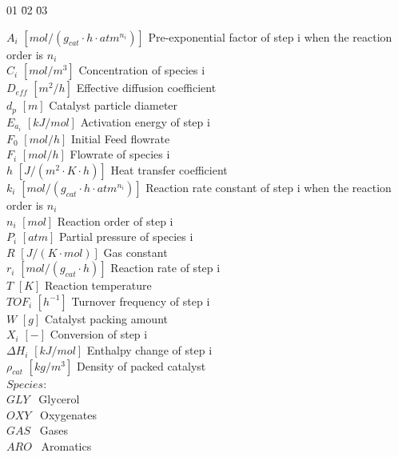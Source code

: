 \documentclass[journal=iecred,manuscript=article]{achemso}
\begin{document}
\begin{tabbing}

01\hspace*{50bp} \=02\hspace*{100bp} \=03\hspace*{50bp}\kill

$A_i$  \> $[mol/(g_{cat} \cdot h \cdot atm^{n_i})]$   \> Pre-exponential factor of step i when the reaction order is $n_i$ \\
$C_i$  \> $[mol/m^3]$   \> Concentration of species i \\
$D_{eff}$  \> $[m^2/h]$   \> Effective diffusion coefficient \\
$d_p$  \> $[m]$   \> Catalyst particle diameter \\
$E_{a_i}$  \> $[kJ/mol]$   \> Activation energy of step i \\
$F_0$  \> $[mol/h]$   \> Initial Feed flowrate \\
$F_i$  \> $[mol/h]$   \> Flowrate of species i \\
$h$  \> $[J/\left( m^2 \cdot K \cdot h\right)]$   \> Heat transfer coefficient \\
$k_i$  \> $[mol/(g_{cat} \cdot h \cdot atm^{n_i}) ]$   \> Reaction rate constant of step i when the reaction order is $n_i$\\
$n_i$  \> $[mol]$   \> Reaction order of step  i \\
$P_i$  \> $[atm]$   \> Partial pressure of species i \\
$R$  \> $[J/\left(K \cdot mol \right)]$   \> Gas constant \\
$r_i$  \> $[mol/\left( g_{cat} \cdot h\right)]$  \> Reaction rate of step i \\
$T$  \> $[K]$  \> Reaction temperature \\
$TOF_i$  \> $[h^{-1}]$  \> Turnover frequency of step i \\
$W$  \> $[g]$   \> Catalyst packing amount\\
$X_i$  \> $[-]$   \> Conversion of step  i \\
$\Delta H_i$  \> $[kJ/mol]$   \> Enthalpy change of step i \\
$\rho_{cat}$  \> $[kg/m^3]$   \> Density of packed catalyst \\


$Species:$  \>    \ \\
$GLY$  \>    \ Glycerol\\
$OXY$  \>    \ Oxygenates\\
$GAS$ \>    \ Gases\\
$ARO$  \>    \ Aromatics\\

\end{tabbing}
\end{document}
